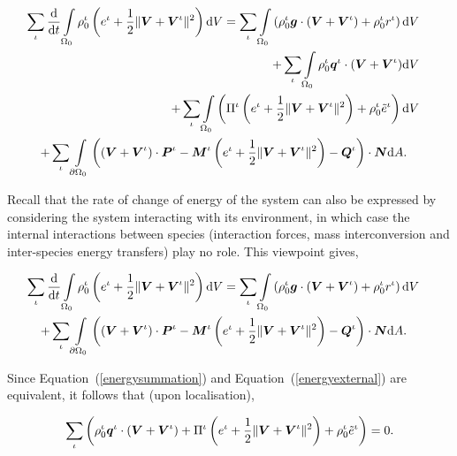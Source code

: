 \begin{eqnarray}
\sum\limits_{\iota}\frac{\mathrm{d}}{\mathrm{d}t}
\int\limits_{\Omega_0}\rho_0^\iota \left ( e^\iota + \frac{1}{2}
\Vert\mbox{\boldmath$ V$}+\mbox{\boldmath$ V$}^\iota\Vert^2 \right ) \mathrm{d}V =
\sum\limits_{\iota}\int\limits_{\Omega_0} \left(\rho_0^\iota\mbox{\boldmath$ g$}
\cdot\left(\mbox{\boldmath$ V$}+\mbox{\boldmath$ V$}^\iota\right) + \rho_0^\iota r^\iota
\right)\mathrm{d}V& &\nonumber\\ +
\sum\limits_{\iota}\int\limits_{\Omega_0}
\rho_0^\iota\mbox{\boldmath$ q$}^\iota\cdot(\mbox{\boldmath$ V$}+\mbox{\boldmath$ V$}^\iota)\mathrm{d}V&  
&\nonumber\\
+ \sum\limits_{\iota}\int\limits_{\Omega_0}
\left(\Pi^\iota\left(e^\iota
+ \frac{1}{2}\Vert\mbox{\boldmath$ V$}+\mbox{\boldmath$ V$}^\iota\Vert^2\right) +
\rho^\iota_0\tilde{e}^\iota\right)\mathrm{d}V & &  \\ 
+\sum\limits_{\iota}\int\limits_{\partial
  \Omega_0}\left(\left(\mbox{\boldmath$ V$}+\mbox{\boldmath$ V$}^\iota\right)\cdot\mbox{\boldmath$ P$}^\iota -
\mbox{\boldmath$ M$}^\iota\left(e^\iota +\frac{1}{2}
\Vert\mbox{\boldmath$ V$}+\mbox{\boldmath$ V$}^\iota\Vert^2\right) -
\mbox{\boldmath$ Q$}^\iota\right)\cdot\mbox{\boldmath$ N$}\mathrm{d}A.\quad& & \nonumber
\label{energysummation}
\end{eqnarray}

Recall that the rate of change of energy of the system can also be
expressed by considering the system interacting with its environment,
in which case the internal interactions between species (interaction
forces, mass interconversion and inter-species energy transfers) play
no role. This viewpoint gives,

\begin{eqnarray}
\sum\limits_{\iota}\frac{\mathrm{d}}{\mathrm{d}t}
\int\limits_{\Omega_0}\rho_0^\iota \left ( e^\iota + \frac{1}{2}
\Vert\mbox{\boldmath$ V$}+\mbox{\boldmath$ V$}^\iota\Vert^2 \right ) \mathrm{d}V =
\sum\limits_{\iota}\int\limits_{\Omega_0} \left(\rho_0^\iota\mbox{\boldmath$ g$}
\cdot\left(\mbox{\boldmath$ V$}+\mbox{\boldmath$ V$}^\iota\right) + \rho_0^\iota r^\iota
\right)\mathrm{d}V &
&\nonumber\\
+\sum\limits_{\iota}\int\limits_{\partial
\Omega_0}\left(\left(\mbox{\boldmath$ V$}+\mbox{\boldmath$ V$}^\iota\right)\cdot\mbox{\boldmath$ P$}^\iota -
\mbox{\boldmath$ M$}^\iota\left(e^\iota +\frac{1}{2}
\Vert\mbox{\boldmath$ V$}+\mbox{\boldmath$ V$}^\iota\Vert^2\right) -
\mbox{\boldmath$ Q$}^\iota\right)\cdot\mbox{\boldmath$ N$}\mathrm{d}A.\quad& &
\label{energyexternal}
\end{eqnarray}

Since Equation~(\ref{energysummation}) and
Equation~(\ref{energyexternal}) are equivalent, it follows that (upon
localisation),

\begin{eqnarray}
\sum\limits_{\iota}\left(\rho_0^\iota\mbox{\boldmath$ q$}^\iota\cdot(\mbox{\boldmath$ V$}+\mbox{\boldmath$ V$}^\iota)
+ \Pi^\iota\left(e^\iota +
\frac{1}{2}\Vert\mbox{\boldmath$ V$}+\mbox{\boldmath$ V$}^\iota\Vert^2\right) +
\rho^\iota_0\tilde{e}^\iota\right) =
0. \label{energysummationresult}
\end{eqnarray}

